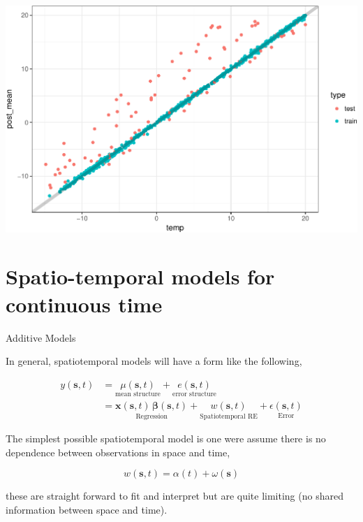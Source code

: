 \documentclass[11pt,ignorenonframetext,]{beamer}
\begin{document}
\begin{frame}{}
\protect\hypertarget{section-4}{}

\begin{center}\includegraphics[width=\textwidth]{Lec22_files/figure-beamer/unnamed-chunk-21-1} \end{center}

\end{frame}

\hypertarget{spatio-temporal-models-for-continuous-time}{%
\section{Spatio-temporal models for continuous
time}\label{spatio-temporal-models-for-continuous-time}}

\begin{frame}[t]{Additive Models}
\protect\hypertarget{additive-models}{}

In general, spatiotemporal models will have a form like the following,

\[
\begin{aligned}
y(\symbf{s},{t}) 
  &= \underset{\text{mean structure}}{\mu(\symbf{s},{t})} + \underset{\text{error structure}}{{e}(\symbf{s},{t})} \\
  &= \underset{\text{Regression}}{\symbf{x}(\symbf{s},{t}) \, \symbf{\beta}(\symbf{s},{t})} + \underset{\text{Spatiotemporal RE}}{{w}(\symbf{s},{t})} + \underset{\text{Error}}{\epsilon(\symbf{s},{t})}
\end{aligned} 
\]

\pause

\vspace{5mm}

The simplest possible spatiotemporal model is one were assume there is
no dependence between observations in space and time,

\[
w(\symbf{s},t) = \alpha(t) + \omega(\symbf{s})
\]

these are straight forward to fit and interpret but are quite limiting
(no shared information between space and time).

\end{frame}
\end{document}
